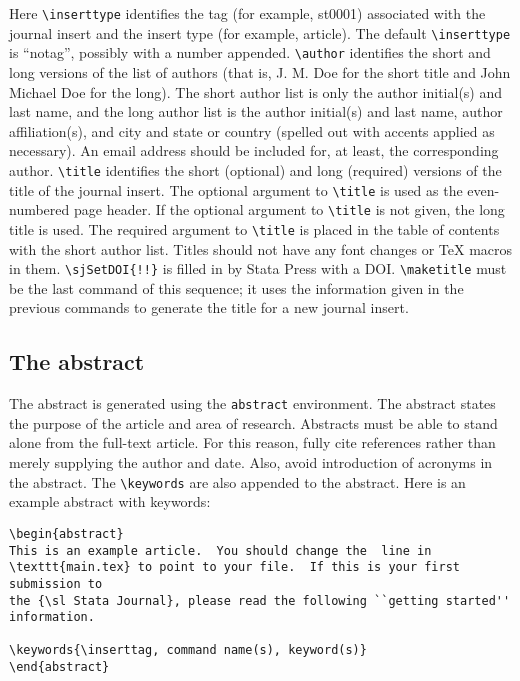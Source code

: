 Here \verb+\inserttype+ identifies the tag (for example, st0001) associated
with the journal insert and the insert type (for example, article).  The default
\verb+\inserttype+ is ``notag'', possibly with a number appended.
\verb+\author+ identifies the short and long versions of the list of
authors (that is, J. M. Doe for the short title and John Michael Doe for the 
long).  The short author list is only the author initial(s) and last name, and
the long author list is the author initial(s) and last name, author
affiliation(s), and city and state or country (spelled out with accents
applied as necessary). An email address should be included for, at least, the
corresponding author. \verb+\title+ identifies the short (optional) and long (required)
versions of the title of the journal insert.  The optional argument to
\verb+\title+ is used as the even-numbered page header.  If the optional
argument to \verb+\title+ is not given, the long title is used.  The required
argument to \verb+\title+ is placed in the table of contents with the short
author list.  Titles should not have any font changes or {\TeX} macros in
them.  \verb+\sjSetDOI{!!}+ is filled in by Stata Press with a {\smrm DOI}.
\verb+\maketitle+ must be the last command of this sequence; it uses
the information given in the previous commands to generate the title for a new
journal insert.

\subsection{The abstract}

The abstract is generated using the \texttt{abstract} environment.  The
abstract states the purpose of the article and area of research.
Abstracts must be able to stand alone from the full-text article. For
this reason, fully cite references rather than merely supplying the
author and date. Also, avoid introduction of acronyms in the abstract.
The \verb+\keywords+ are also appended to the abstract.  Here is an
example abstract with keywords:

\begin{stverbatim}
\begin{verbatim}
\begin{abstract}
This is an example article.  You should change the  line in
\texttt{main.tex} to point to your file.  If this is your first submission to
the {\sl Stata Journal}, please read the following ``getting started''
information.

\keywords{\inserttag, command name(s), keyword(s)}
\end{abstract}
\end{verbatim}
\end{stverbatim}

